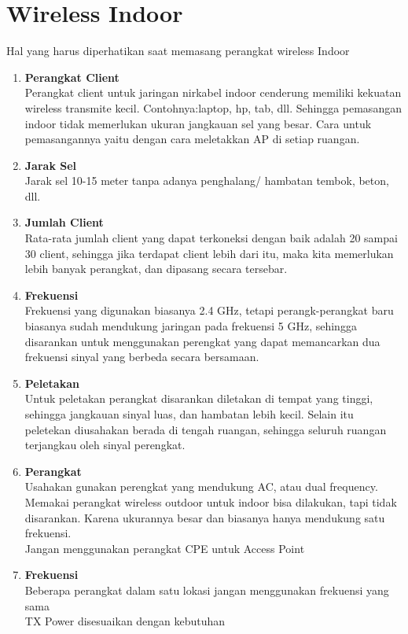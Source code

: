 \documentclass[a4paper,12pt]{article}
\begin{document}
\section{Wireless Indoor}
Hal yang harus diperhatikan saat memasang perangkat wireless Indoor
\begin{enumerate}
    \item \textbf{Perangkat Client\\}
        Perangkat client untuk jaringan nirkabel indoor cenderung memiliki kekuatan wireless transmite kecil.
        Contohnya:laptop, hp, tab, dll. Sehingga pemasangan indoor
        tidak memerlukan ukuran jangkauan sel yang besar. Cara untuk
        pemasangannya yaitu dengan cara meletakkan AP di setiap ruangan.

    \item \textbf{Jarak Sel\\}
            Jarak sel 10-15 meter tanpa adanya penghalang/ hambatan tembok,
            beton, dll.

    \item \textbf{Jumlah Client\\}
        Rata-rata jumlah client yang dapat terkoneksi dengan baik adalah 20 sampai 30 client, sehingga jika terdapat
        client lebih dari itu, maka kita memerlukan lebih banyak perangkat, dan dipasang secara tersebar.

    \item \textbf{Frekuensi\\}
        Frekuensi yang digunakan biasanya 2.4 GHz, tetapi perangk-perangkat baru biasanya sudah mendukung jaringan pada
        frekuensi 5 GHz, sehingga disarankan untuk menggunakan perengkat yang dapat memancarkan dua frekuensi sinyal
        yang berbeda secara bersamaan.

    \item \textbf{Peletakan\\}
        Untuk peletakan perangkat disarankan diletakan di tempat yang tinggi, sehingga jangkauan sinyal luas, dan
        hambatan lebih kecil. Selain itu peletekan diusahakan berada di tengah ruangan, sehingga seluruh ruangan
        terjangkau oleh sinyal perengkat.

    \item \textbf{Perangkat\\}
        Usahakan gunakan perengkat yang mendukung AC, atau dual frequency.\\
        Memakai perangkat wireless outdoor untuk indoor bisa dilakukan, tapi tidak disarankan. Karena ukurannya besar
        dan biasanya hanya mendukung satu frekuensi.\\
        Jangan menggunakan perangkat CPE untuk Access Point

    \item \textbf{Frekuensi\\}
        Beberapa perangkat dalam satu lokasi jangan menggunakan frekuensi yang sama\\
        TX Power disesuaikan dengan kebutuhan\\
\end{enumerate}
\end{document}
